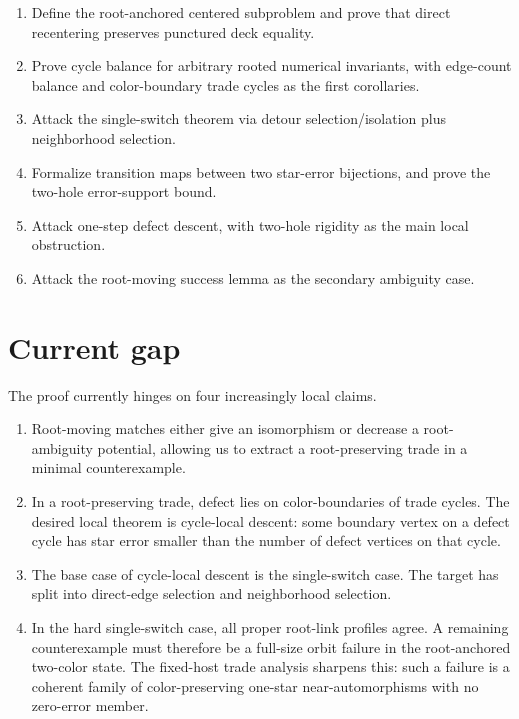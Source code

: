 \documentclass[11pt]{article}
\begin{document}
\begin{enumerate}[leftmargin=2em]
  \item Define the root-anchored centered subproblem and prove that direct
  recentering preserves punctured deck equality.

  \item Prove cycle balance for arbitrary rooted numerical invariants, with
  edge-count balance and color-boundary trade cycles as the first corollaries.

  \item Attack the single-switch theorem via detour selection/isolation plus
  neighborhood selection.

  \item Formalize transition maps between two star-error bijections, and prove
  the two-hole error-support bound.

  \item Attack one-step defect descent, with two-hole rigidity as the main
  local obstruction.

  \item Attack the root-moving success lemma as the secondary ambiguity case.
\end{enumerate}

\section{Current gap}

The proof currently hinges on four increasingly local claims.

\begin{enumerate}[leftmargin=2em]
  \item Root-moving matches either give an isomorphism or decrease a
  root-ambiguity potential, allowing us to extract a root-preserving trade in
  a minimal counterexample.

  \item In a root-preserving trade, defect lies on color-boundaries of trade
  cycles.  The desired local theorem is cycle-local descent: some boundary
  vertex on a defect cycle has star error smaller than the number of defect
  vertices on that cycle.

  \item The base case of cycle-local descent is the single-switch case.  The
  target has split into direct-edge selection and neighborhood selection.

  \item In the hard single-switch case, all proper root-link profiles agree.
  A remaining counterexample must therefore be a full-size orbit failure in
  the root-anchored two-color state.  The fixed-host trade analysis sharpens
  this: such a failure is a coherent family of color-preserving one-star
  near-automorphisms with no zero-error member.
\end{enumerate}
\end{document}
